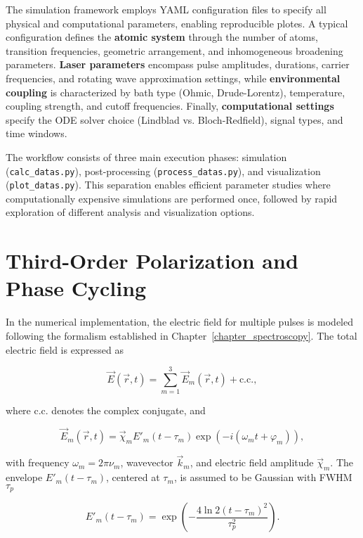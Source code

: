\noindent
The simulation framework employs YAML configuration files to specify all physical and computational parameters, enabling reproducible plotes. A typical configuration defines the \textbf{atomic system} through the number of atoms, transition frequencies, geometric arrangement, and inhomogeneous broadening parameters. \textbf{Laser parameters} encompass pulse amplitudes, durations, carrier frequencies, and rotating wave approximation settings, while \textbf{environmental coupling} is characterized by bath type (Ohmic, Drude-Lorentz), temperature, coupling strength, and cutoff frequencies. Finally, \textbf{computational settings} specify the ODE solver choice (Lindblad vs. Bloch-Redfield), signal types, and time windows.

\noindent
The workflow consists of three main execution phases: simulation (\texttt{calc\_datas.py}), post-processing (\texttt{process\_datas.py}), and visualization (\texttt{plot\_datas.py}). This separation enables efficient parameter studies where computationally expensive simulations are performed once, followed by rapid exploration of different analysis and visualization options.

\section{Third-Order Polarization and Phase Cycling}
\label{sec:third_order_polarization}

\noindent
In the numerical implementation, the electric field for multiple pulses is modeled following the formalism established in Chapter~\ref{chapter_spectroscopy}. The total electric field is expressed as

\begin{equation}
	\vec{E}(\vec{r},t) = \sum_{m=1}^{3} \vec{E}_m(\vec{r},t) + \mathrm{c.c.},
\end{equation}

where c.c. denotes the complex conjugate, and

\begin{equation}
	\vec{E}_m(\vec{r},t) = \vec{\chi}_m E'_m(t - \tau_m) \exp(-i (\omega_m t + \varphi_m)),
\end{equation}

with frequency $\omega_m = 2\pi \nu_m$, wavevector $\vec{k}_m$, and electric field amplitude $\vec{\chi}_m$. The envelope $E'_m(t - \tau_m)$, centered at $\tau_m$, is assumed to be Gaussian with FWHM $\tau_p$

\begin{equation}
	E'_m(t - \tau_m) = \exp\left( -\frac{4 \ln 2 (t - \tau_m)^2}{\tau_p^2} \right).
\end{equation}

